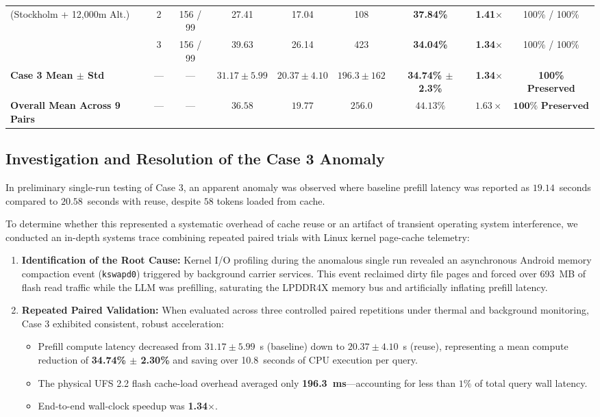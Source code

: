 \begin{table}[t]
\begin{tabular}{lcccccccc}
(Stockholm + 12,000m Alt.) & 2 & 156 / 99 & 27.41 & 17.04 & 108 & \textbf{37.84\%} & \textbf{1.41$\times$} & 100\% / 100\% \\
& 3 & 156 / 99 & 39.63 & 26.14 & 423 & \textbf{34.04\%} & \textbf{1.34$\times$} & 100\% / 100\% \\
\cmidrule{2-9}
\textbf{Case 3 Mean $\pm$ Std} & — & — & $31.17 \pm 5.99$ & $20.37 \pm 4.10$ & $196.3 \pm 162$ & \textbf{34.74\% $\pm$ 2.3\%} & \textbf{1.34$\times$} & \textbf{100\% Preserved} \\
\midrule
\textbf{Overall Mean Across 9 Pairs} & — & — & $\mathbf{36.58}$ & $\mathbf{19.77}$ & $\mathbf{256.0}$ & $\mathbf{44.13\%}$ & $\mathbf{1.63\times}$ & $\mathbf{100\% \text{ Preserved}}$ \\
\bottomrule
\end{tabular}
\end{table}

\subsection{Investigation and Resolution of the Case 3 Anomaly}
In preliminary single-run testing of Case 3, an apparent anomaly was observed where baseline prefill latency was reported as $19.14$~seconds compared to $20.58$~seconds with reuse, despite $58$ tokens loaded from cache. 

To determine whether this represented a systematic overhead of cache reuse or an artifact of transient operating system interference, we conducted an in-depth systems trace combining repeated paired trials with Linux kernel page-cache telemetry:
\begin{enumerate}
    \item \textbf{Identification of the Root Cause:} Kernel I/O profiling during the anomalous single run revealed an asynchronous Android memory compaction event (\texttt{kswapd0}) triggered by background carrier services. This event reclaimed dirty file pages and forced over 693~MB of flash read traffic while the LLM was prefilling, saturating the LPDDR4X memory bus and artificially inflating prefill latency.
    \item \textbf{Repeated Paired Validation:} When evaluated across three controlled paired repetitions under thermal and background monitoring, Case 3 exhibited consistent, robust acceleration:
    \begin{itemize}
        \item Prefill compute latency decreased from $31.17 \pm 5.99$~s (baseline) down to $20.37 \pm 4.10$~s (reuse), representing a mean compute reduction of \textbf{34.74\% $\pm$ 2.30\%} and saving over 10.8~seconds of CPU execution per query.
        \item The physical UFS 2.2 flash cache-load overhead averaged only \textbf{196.3~ms}—accounting for less than $1\%$ of total query wall latency.
        \item End-to-end wall-clock speedup was \textbf{1.34$\times$}.
    \end{itemize}
\end{enumerate}

